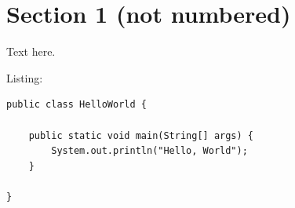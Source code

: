 \documentclass[a4paper,11pt]{report}
\begin{document}
\section*{Section 1 (not numbered)}

Text here.

Listing:

\begin{lstlisting}
public class HelloWorld {

    public static void main(String[] args) {
        System.out.println("Hello, World");
    }

}
\end{lstlisting}
\end{document}
